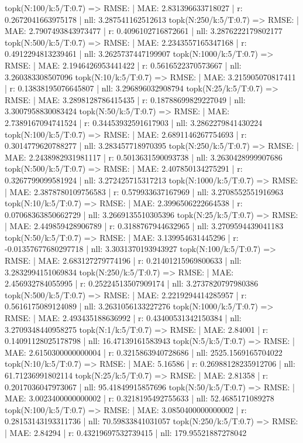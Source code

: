 topk(N:100/k:5/T:0.7) => RMSE: | MAE: 2.831396633718027 | r: 0.2672041663975178 | nll: 3.287541162512613
topk(N:250/k:5/T:0.7) => RMSE: | MAE: 2.7907493843973477 | r: 0.4096102716872661 | nll: 3.2876222179802177
topk(N:500/k:5/T:0.7) => RMSE: | MAE: 2.2343557165347168 | r: 0.4912294813239461 | nll: 3.2625737447199907
topk(N:1000/k:5/T:0.7) => RMSE: | MAE: 2.1946426953441422 | r: 0.5616522370573667 | nll: 3.260383308507096
topk(N:10/k:5/T:0.7) => RMSE: | MAE: 3.215905070817411 | r: 0.13838195076645807 | nll: 3.296896032908794
topk(N:25/k:5/T:0.7) => RMSE: | MAE: 3.2898128786415435 | r: 0.18788699829227049 | nll: 3.3007958830083424
topk(N:50/k:5/T:0.7) => RMSE: | MAE: 2.7389167094741524 | r: 0.34453932591617903 | nll: 3.2862279841430224
topk(N:100/k:5/T:0.7) => RMSE: | MAE: 2.6891146267754693 | r: 0.3014779620788277 | nll: 3.283457718970395
topk(N:250/k:5/T:0.7) => RMSE: | MAE: 2.2438982931981117 | r: 0.5013631590093738 | nll: 3.2630428999907686
topk(N:500/k:5/T:0.7) => RMSE: | MAE: 2.407850134275291 | r: 0.3267799099581924 | nll: 3.272425715317213
topk(N:1000/k:5/T:0.7) => RMSE: | MAE: 2.3878780109756583 | r: 0.579933637167969 | nll: 3.2708552551916963
topk(N:10/k:5/T:0.7) => RMSE: | MAE: 2.3996506222664538 | r: 0.07068363850662729 | nll: 3.2669135510305396
topk(N:25/k:5/T:0.7) => RMSE: | MAE: 2.449859428906789 | r: 0.3188767944632965 | nll: 3.2709594439041183
topk(N:50/k:5/T:0.7) => RMSE: | MAE: 3.139954631445296 | r: -0.01357677680297718 | nll: 3.3031370193943927
topk(N:100/k:5/T:0.7) => RMSE: | MAE: 2.683127279774196 | r: 0.21401215969800633 | nll: 3.2832994151069834
topk(N:250/k:5/T:0.7) => RMSE: | MAE: 2.456932784055995 | r: 0.25224513507909174 | nll: 3.2737820797980386
topk(N:500/k:5/T:0.7) => RMSE: | MAE: 2.2219294414285957 | r: 0.5616175089124089 | nll: 3.2631056133227276
topk(N:1000/k:5/T:0.7) => RMSE: | MAE: 2.493435188636992 | r: 0.43400531342150384 | nll: 3.2709348440958275
topk(N:1/k:5/T:0.7) => RMSE: | MAE: 2.84001 | r: 0.14091128025178798 | nll: 16.47139161583943
topk(N:5/k:5/T:0.7) => RMSE: | MAE: 2.6150300000000004 | r: 0.3215863940728686 | nll: 2525.1569165704022
topk(N:10/k:5/T:0.7) => RMSE: | MAE: 5.16586 | r: 0.26988128235912706 | nll: 61.71236991802114
topk(N:25/k:5/T:0.7) => RMSE: | MAE: 2.81358 | r: 0.2017036047973067 | nll: 95.41849915857696
topk(N:50/k:5/T:0.7) => RMSE: | MAE: 3.0023400000000002 | r: 0.3218195492755633 | nll: 52.4685171089278
topk(N:100/k:5/T:0.7) => RMSE: | MAE: 3.0850400000000002 | r: 0.28153143193311736 | nll: 70.59833841031057
topk(N:250/k:5/T:0.7) => RMSE: | MAE: 2.84294 | r: 0.43219697532739415 | nll: 179.95521887278042
